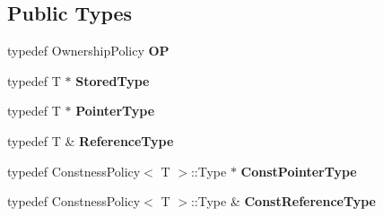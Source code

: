 \subsection*{Public Types}
\begin{DoxyCompactItemize}
\item 
\hypertarget{classLoki_1_1StrongPtr_a13f5d54d7ba4a0e70e9314ce8f027ac4}{}typedef Ownership\+Policy {\bfseries O\+P}\label{classLoki_1_1StrongPtr_a13f5d54d7ba4a0e70e9314ce8f027ac4}

\item 
\hypertarget{classLoki_1_1StrongPtr_af49fa35684f4cf38463bafb959719ff9}{}typedef T $\ast$ {\bfseries Stored\+Type}\label{classLoki_1_1StrongPtr_af49fa35684f4cf38463bafb959719ff9}

\item 
\hypertarget{classLoki_1_1StrongPtr_aef3d56469eb67536e92eb6267a2bf8c6}{}typedef T $\ast$ {\bfseries Pointer\+Type}\label{classLoki_1_1StrongPtr_aef3d56469eb67536e92eb6267a2bf8c6}

\item 
\hypertarget{classLoki_1_1StrongPtr_a6b8be7a52c9237a34ba34a37efb18c76}{}typedef T \& {\bfseries Reference\+Type}\label{classLoki_1_1StrongPtr_a6b8be7a52c9237a34ba34a37efb18c76}

\item 
\hypertarget{classLoki_1_1StrongPtr_aa8a6126984d2f0be535a12d8c6db18f4}{}typedef Constness\+Policy$<$ T $>$\+::Type $\ast$ {\bfseries Const\+Pointer\+Type}\label{classLoki_1_1StrongPtr_aa8a6126984d2f0be535a12d8c6db18f4}

\item 
\hypertarget{classLoki_1_1StrongPtr_a67dcbbd3fc3e1c0e96491291b9cbbc23}{}typedef Constness\+Policy$<$ T $>$\+::Type \& {\bfseries Const\+Reference\+Type}\label{classLoki_1_1StrongPtr_a67dcbbd3fc3e1c0e96491291b9cbbc23}

\end{DoxyCompactItemize}
